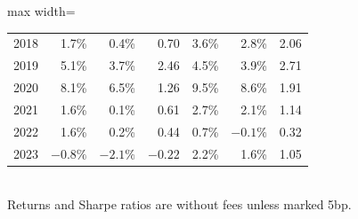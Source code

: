 \documentclass[12pt,letterpaper]{article}
\begin{document}
\begin{table}[!htbp]
\begin{adjustbox}{max width=\linewidth}
\begin{tabular}{lrrrrrr}
2018 & 1.7\% & 0.4\% & 0.70 & 3.6\% & 2.8\% & 2.06 \\
2019 & 5.1\% & 3.7\% & 2.46 & 4.5\% & 3.9\% & 2.71 \\
2020 & 8.1\% & 6.5\% & 1.26 & 9.5\% & 8.6\% & 1.91 \\
2021 & 1.6\% & 0.1\% & 0.61 & 2.7\% & 2.1\% & 1.14 \\
2022 & 1.6\% & 0.2\% & 0.44 & 0.7\% & $-0.1\%$ & 0.32 \\
2023 & $-0.8\%$ & $-2.1\%$ & $-0.22$ & 2.2\% & 1.6\% & 1.05 \\
\bottomrule
\end{tabular}
\end{adjustbox}
\\[4pt]
\small Returns and Sharpe ratios are without fees unless marked 5bp.
\end{table}
\end{document}
